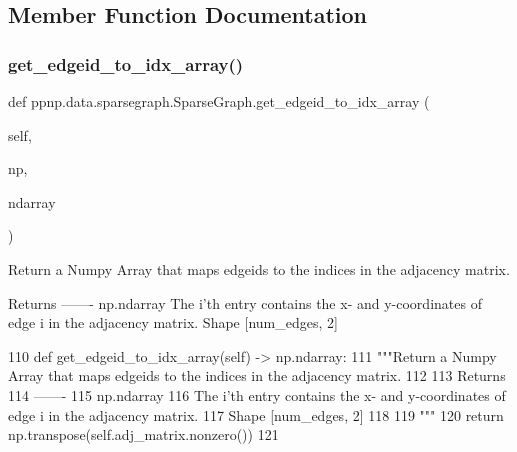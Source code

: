 \subsection{Member Function Documentation}
\mbox{\label{classppnp_1_1data_1_1sparsegraph_1_1SparseGraph_a6956c8f43642f31d76ccf5863572cab8}} 
\subsubsection{\texorpdfstring{get\+\_\+edgeid\+\_\+to\+\_\+idx\+\_\+array()}{get\_edgeid\_to\_idx\_array()}}
{\footnotesize\ttfamily def ppnp.\+data.\+sparsegraph.\+Sparse\+Graph.\+get\+\_\+edgeid\+\_\+to\+\_\+idx\+\_\+array (\begin{DoxyParamCaption}\item[{}]{self,  }\item[{}]{np,  }\item[{}]{ndarray }\end{DoxyParamCaption})}

\begin{DoxyVerb}Return a Numpy Array that maps edgeids to the indices in the adjacency matrix.

Returns
-------
np.ndarray
    The i'th entry contains the x- and y-coordinates of edge i in the adjacency matrix.
    Shape [num_edges, 2]\end{DoxyVerb}
 
\begin{DoxyCode}
110     \textcolor{keyword}{def }get\_edgeid\_to\_idx\_array(self) -> np.ndarray:
111         \textcolor{stringliteral}{"""Return a Numpy Array that maps edgeids to the indices in the adjacency matrix.}
112 \textcolor{stringliteral}{}
113 \textcolor{stringliteral}{        Returns}
114 \textcolor{stringliteral}{        -------}
115 \textcolor{stringliteral}{        np.ndarray}
116 \textcolor{stringliteral}{            The i'th entry contains the x- and y-coordinates of edge i in the adjacency matrix.}
117 \textcolor{stringliteral}{            Shape [num\_edges, 2]}
118 \textcolor{stringliteral}{}
119 \textcolor{stringliteral}{        """}
120         \textcolor{keywordflow}{return} np.transpose(self.adj\_matrix.nonzero())
121 
\end{DoxyCode}
\mbox{\label{classppnp_1_1data_1_1sparsegraph_1_1SparseGraph_a37251710c9d18270cf3a2fdb8e24df22}} 
